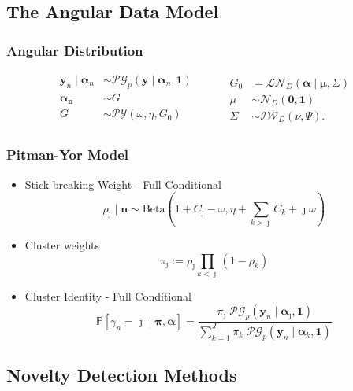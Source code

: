 \documentclass[aspectratio=169,10pt]{beamer}
\begin{document}
\subsection{The Angular Data Model}

\begin{frame}
    \frametitle{Angular Distribution}
    \[
        \begin{aligned}
        \bm{y}_n \mid \bm{\alpha}_n &\sim \mathcal{PG}_p
                \left(\bm{y}\mid\bm{\alpha}_n, \bm{1}\right)\\
        \bm{\alpha_n} &\sim G\\
        G &\sim \mathcal{PY}\left(\omega, \eta, G_0\right)\\
        \end{aligned}
        ~\hspace{1cm}
        \begin{aligned}
        G_0 &= \mathcal{LN}_D\left(\bm{\alpha}\mid\bm{\mu},\Sigma\right)\\
        \mu &\sim \mathcal{N}_D\left(\bm{0},\bm{1}\right)\\
        \Sigma &\sim \mathcal{IW}_D\left(\nu, \Psi\right).
        \end{aligned}
    \]
\end{frame} %

\begin{frame}
    \frametitle{Pitman-Yor Model}
    \begin{itemize}
    \item Stick-breaking Weight - Full Conditional
    \[
    \rho_{\jmath} \mid \bm{n} \sim \text{Beta}\left(1 + C_{\jmath} - \omega, 
            \eta + \sum_{k > \jmath} C_k + \jmath \omega\right)
    \]
    \item Cluster weights
    \[
        \pi_{\jmath} := \rho_{\jmath} \prod_{k < \jmath}(1 - \rho_k)
    \]
    \item Cluster Identity - Full Conditional
    \[
    \mathbb{P}\left[\gamma_n = \jmath \mid \bm{\pi},\bm{\alpha}\right] =
            \frac{\pi_{\jmath}\;\mathcal{PG}_p\left(\bm{y}_n\mid\bm{\alpha}_{\jmath},\bm{1}\right)}{
                \sum_{k = 1}^J \pi_k\;
                \mathcal{PG}_p\left(\bm{y}_n\mid\bm{\alpha}_k,\bm{1}\right)}
    \]
    \end{itemize}
\end{frame} %

\subsection{Novelty Detection Methods}
\end{document}
